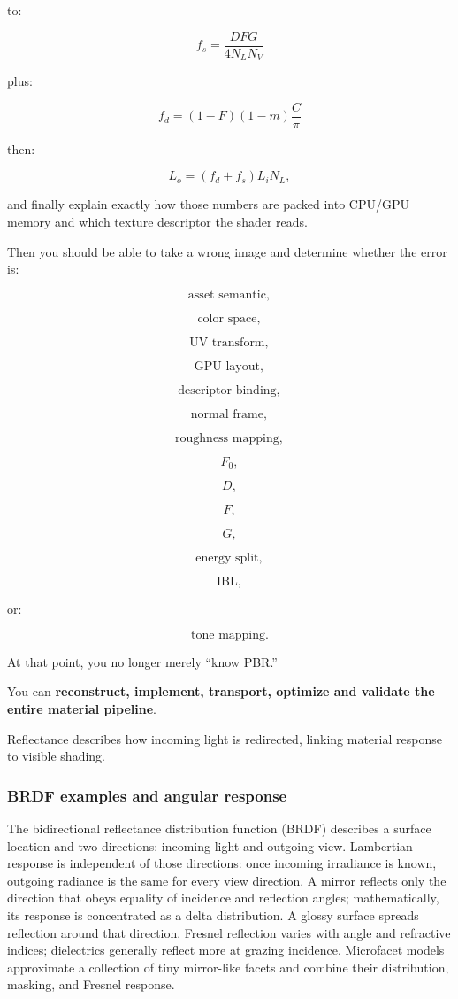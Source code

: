 to:

\[
f_s=
\frac{DFG}{4N_LN_V}
\]

plus:

\[
f_d=
(1-F)(1-m)\frac{C}{\pi}
\]

then:

\[
L_o=
(f_d+f_s)L_iN_L,
\]

and finally explain exactly how those numbers are packed into CPU/GPU memory and which texture descriptor the shader reads.

Then you should be able to take a wrong image and determine whether the error is:

\[
\text{asset semantic},
\]

\[
\text{color space},
\]

\[
\text{UV transform},
\]

\[
\text{GPU layout},
\]

\[
\text{descriptor binding},
\]

\[
\text{normal frame},
\]

\[
\text{roughness mapping},
\]

\[
F_0,
\]

\[
D,
\]

\[
F,
\]

\[
G,
\]

\[
\text{energy split},
\]

\[
\text{IBL},
\]

or:

\[
\text{tone mapping}.
\]

At that point, you no longer merely ``know PBR.''

You can \textbf{reconstruct, implement, transport, optimize and validate the entire material pipeline}.

Reflectance describes how incoming light is redirected, linking material response to visible shading.

\subsubsection{BRDF examples and angular response}\label{brdf-examples-and-angular-response}

The bidirectional reflectance distribution function (BRDF) describes a surface location and two directions: incoming light and outgoing view. Lambertian response is independent of those directions: once incoming irradiance is known, outgoing radiance is the same for every view direction. A mirror reflects only the direction that obeys equality of incidence and reflection angles; mathematically, its response is concentrated as a delta distribution. A glossy surface spreads reflection around that direction. Fresnel reflection varies with angle and refractive indices; dielectrics generally reflect more at grazing incidence. Microfacet models approximate a collection of tiny mirror-like facets and combine their distribution, masking, and Fresnel response.

